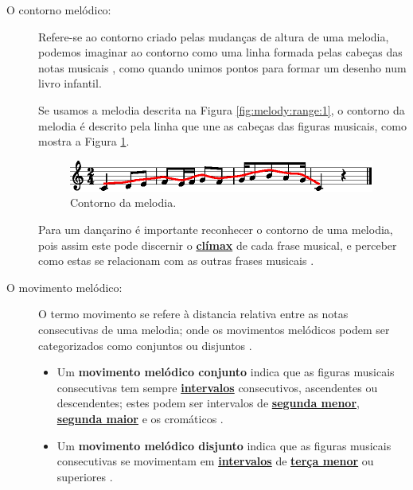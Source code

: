 \begin{description}
\item[O contorno melódico:] 
\label{ref:melodica:shape}
Refere-se ao contorno criado pelas mudanças de altura de uma melodia,
podemos imaginar ao contorno como uma linha formada pelas cabeças das notas musicais 
\cite[pp. 44]{holland2013music} \cite[pp. 61]{chazin2016teaching} \cite[pp. 50]{langer2017theory},
como quando unimos pontos para formar um desenho num livro infantil.


\begin{example}
Se usamos a melodia descrita na Figura \ref{fig:melody:range:1}, 
o contorno da melodia é descrito pela linha que une as cabeças das figuras musicais,
como mostra a Figura \ref{fig:melody:shape:1}.
\end{example}
\begin{figure}[!h]
\centering
\includegraphics[width=0.99\textwidth]{chapters/cap-musicalidade-percepcion/melodia-carateristicas-shape.eps}
\caption{Contorno da melodia.}
\label{fig:melody:shape:1}
\end{figure}

Para um dançarino é importante reconhecer o contorno de uma melodia, 
pois assim este pode discernir o \hyperref[ref:climax]{\textbf{clímax}} de cada frase musical, 
e perceber como estas se relacionam com as outras frases musicais
\cite[pp. 45]{holland2013music}.

\item[O movimento melódico:]
\label{ref:melodica:movimento}
O termo movimento se refere à distancia relativa entre as notas consecutivas de uma melodia;
onde os movimentos melódicos podem ser categorizados como conjuntos ou disjuntos 
\cite[pp. 52]{langer2017theory} \cite[pp. 165]{reinato2010musicavol1} \cite[pp. 45]{holland2013music}. 
\begin{itemize}
\item Um \textbf{movimento melódico conjunto} indica 
que as figuras musicais consecutivas
tem sempre \hyperref[sec:intervalomelodico]{\textbf{intervalos}} consecutivos,
ascendentes ou descendentes; estes podem ser intervalos de 
\hyperref[tab:intervalomelodico2]{\textbf{segunda menor}},
\hyperref[tab:intervalomelodico2]{\textbf{segunda maior}} e
os cromáticos  \cite[pp. 165]{reinato2010musicavol1} \cite[pp. 52]{langer2017theory}.  
\item Um \textbf{movimento melódico disjunto} indica 
que as figuras musicais consecutivas
se movimentam em \hyperref[sec:intervalomelodico]{\textbf{intervalos}} 
de \hyperref[tab:intervalomelodico2]{\textbf{terça menor}} ou superiores 
\cite[pp. 166]{reinato2010musicavol1} \cite[pp. 53]{langer2017theory}.
\end{itemize}~


\end{description}
